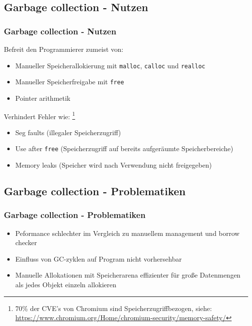 \documentclass{beamer}
\begin{document}
        \subsection{Garbage collection - Nutzen}
            \begin{frame}
                \frametitle{Garbage collection - Nutzen}

                Befreit den Programmierer zumeist von:
                \begin{itemize}
                    \item Manueller Speicherallokierung mit \texttt{malloc}, \texttt{calloc} und \texttt{realloc}
                    \item Manueller Speicherfreigabe mit \texttt{free}
                    \item Pointer arithmetik
                \end{itemize}

                Verhindert Fehler wie: \footnote{70\% der CVE's von Chromium sind Speicherzugriffbezogen, siehe: \href{https://www.chromium.org/Home/chromium-security/memory-safety/}{https://www.chromium.org/Home/chromium-security/memory-safety/}}
                \begin{itemize}
                    \item Seg faults (illegaler Speicherzugriff) 
                    \item Use after \texttt{free} (Speicherzugriff auf bereits aufgeräumte Speicherbereiche)
                    \item Memory leaks (Speicher wird nach Verwendung nicht freigegeben)
                \end{itemize}
            \end{frame}

        \subsection{Garbage collection - Problematiken}
            \begin{frame}
                \frametitle{Garbage collection - Problematiken}
                \begin{itemize}
                    \item Peformance schlechter im Vergleich zu manuellem
                        management und borrow checker
                    \item Einfluss von GC-zyklen auf Program nicht vorhersehbar
                    \item Manuelle Allokationen mit Speicherarena effizienter
                        für große Datenmengen als jedes Objekt einzeln
                        allokieren
                \end{itemize}
            \end{frame}
\end{document}
